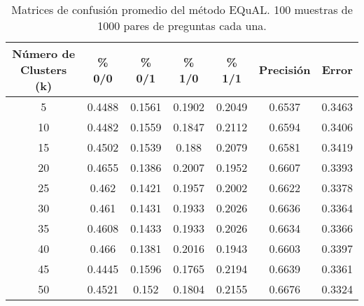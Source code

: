 \begin{table}[]
	\centering
	\begin{tabular}{|c|c|c|c|c|c|c|}
		\hline
		\rowcolor[HTML]{CFE2F3}
		\textbf{Número de Clusters (k)} & \textbf{\% 0/0} & \textbf{\% 0/1} & \textbf{\% 1/0} & \textbf{\% 1/1} & \textbf{Precisión} & \textbf{Error} \\ \hline
		5  & 0.4488 & 0.1561 & 0.1902 & 0.2049 & 0.6537 & 0.3463 \\ \hline
		10 & 0.4482 & 0.1559 & 0.1847 & 0.2112 & 0.6594 & 0.3406 \\ \hline
		15 & 0.4502 & 0.1539 & 0.188  & 0.2079 & 0.6581 & 0.3419 \\ \hline
		20 & 0.4655 & 0.1386 & 0.2007 & 0.1952 & 0.6607 & 0.3393 \\ \hline
		25 & 0.462  & 0.1421 & 0.1957 & 0.2002 & 0.6622 & 0.3378 \\ \hline
		30 & 0.461  & 0.1431 & 0.1933 & 0.2026 & 0.6636 & 0.3364 \\ \hline
		35 & 0.4608 & 0.1433 & 0.1933 & 0.2026 & 0.6634 & 0.3366 \\ \hline
		40 & 0.466  & 0.1381 & 0.2016 & 0.1943 & 0.6603 & 0.3397 \\ \hline
		45 & 0.4445 & 0.1596 & 0.1765 & 0.2194 & 0.6639 & 0.3361 \\ \hline
		\rowcolor[HTML]{D9EAD3}
		50 & 0.4521 & 0.152  & 0.1804 & 0.2155 & 0.6676 & 0.3324 \\ \hline
	\end{tabular}
	\caption{Matrices de confusión promedio del método EQuAL. 100 muestras de 1000 pares de preguntas cada una. }
	\label{tab:analisis-100-1000}
\end{table}

